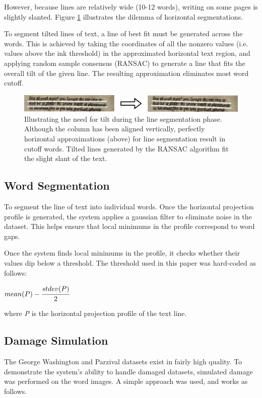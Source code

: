 \documentclass[final]{ukthesis}
\begin{document}
However, because lines are relatively wide (10-12 words), writing on some pages is slightly slanted. Figure \ref{fig:flat-vs-tilted} illustrates the dilemma of horizontal segmentations.

To segment tilted lines of text, a line of best fit must be generated across the words. This is achieved by taking the coordinates of all the nonzero values (i.e. values above the ink threshold) in the approximated horizontal text region, and applying random sample consensus (RANSAC) \cite{fischler1987random} to generate a line that fits the overall tilt of the given line. The resulting approximation eliminates most word cutoff.

\begin{figure}[t]
\begin{center}
\includegraphics[width=14cm]{flat-vs-tilted}
\end{center}
\caption{Illustrating the need for tilt during the line segmentation phase. Although the column has been aligned vertically, perfectly horizontal approximations (above) for line segmentation result in cutoff words. Tilted lines generated by the RANSAC algorithm fit the slight slant of the text.}
\label{fig:flat-vs-tilted}
\end{figure}


\subsection{Word Segmentation}
To segment the line of text into individual words. Once the horizontal projection profile is generated, the system applies a gaussian filter to eliminate noise in the dataset. This helps ensure that local minimums in the profile correspond to word gaps.

Once the system finds local minimums in the profile, it checks whether their values dip below a threshold. The threshold used in this paper was hard-coded as follows:

\begin{center}
\begin{math}
mean(P) - \cfrac{stdev(P)}{2}
\end{math}
\end{center}

where {\em P} is the horizontal projection profile of the text line.


\subsection{Damage Simulation}
The George Washington and Parzival datasets exist in fairly high quality. To demonstrate the system's ability to handle damaged datasets, simulated damage was performed on the word images. A simple approach was used, and works as follows.
\end{document}
